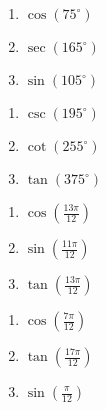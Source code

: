 \documentclass{ximera}
\begin{document}
\begin{multicols}{3}

\begin{enumerate}

\setcounter{enumi}{\value{HW}}

\item  \label{cos75} $\cos(75^{\circ})$ \label{sumdifffirst} 
\item  $\sec(165^{\circ})$
\item  \label{sin105} $\sin(105^{\circ})$

\setcounter{HW}{\value{enumi}}

\end{enumerate}

\end{multicols}

\begin{multicols}{3}

\begin{enumerate}

\setcounter{enumi}{\value{HW}}

\item  $\csc(195^{\circ})$
\item  $\cot(255^{\circ})$
\item  $\tan(375^{\circ})$

\setcounter{HW}{\value{enumi}}

\end{enumerate}

\end{multicols}

\begin{multicols}{3}

\begin{enumerate}

\setcounter{enumi}{\value{HW}}

\item  $\cos\left(\frac{13\pi}{12}\right)$
\item  $\sin\left(\frac{11\pi}{12}\right)$
\item  $\tan\left(\frac{13\pi}{12}\right)$

\setcounter{HW}{\value{enumi}}

\end{enumerate}

\end{multicols}

\begin{multicols}{3}

\begin{enumerate}

\setcounter{enumi}{\value{HW}}

\item \label{cos7pi12} $\cos \left( \frac{7\pi}{12} \right)$
\item $\tan \left( \frac{17\pi}{12} \right)$
\item \label{sinpi12} $\sin \left( \frac{\pi}{12} \right)$ 

\setcounter{HW}{\value{enumi}}

\end{enumerate}

\end{multicols}
\end{document}
